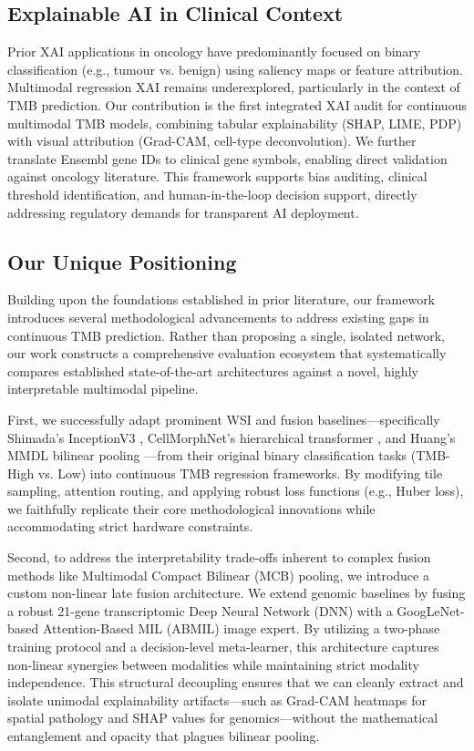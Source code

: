 \documentclass[11pt,a4paper]{article}
\begin{document}
\subsection{Explainable AI in Clinical Context}
Prior XAI applications in oncology have predominantly focused on binary classification (e.g., tumour vs. benign) using saliency maps or feature attribution. Multimodal regression XAI remains underexplored, particularly in the context of TMB prediction. Our contribution is the first integrated XAI audit for continuous multimodal TMB models, combining tabular explainability (SHAP, LIME, PDP) with visual attribution (Grad-CAM, cell-type deconvolution). We further translate Ensembl gene IDs to clinical gene symbols, enabling direct validation against oncology literature. This framework supports bias auditing, clinical threshold identification, and human-in-the-loop decision support, directly addressing regulatory demands for transparent AI deployment.

\subsection{Our Unique Positioning}
Building upon the foundations established in prior literature, our framework introduces several methodological advancements to address existing gaps in continuous TMB prediction. Rather than proposing a single, isolated network, our work constructs a comprehensive evaluation ecosystem that systematically compares established state-of-the-art architectures against a novel, highly interpretable multimodal pipeline.

First, we successfully adapt prominent WSI and fusion baselines—specifically Shimada's InceptionV3 \cite{shimada2021}, CellMorphNet's hierarchical transformer \cite{xu2024cellmorphnet}, and Huang's MMDL bilinear pooling \cite{huang2022}—from their original binary classification tasks (TMB-High vs. Low) into continuous TMB regression frameworks. By modifying tile sampling, attention routing, and applying robust loss functions (e.g., Huber loss), we faithfully replicate their core methodological innovations while accommodating strict hardware constraints.

Second, to address the interpretability trade-offs inherent to complex fusion methods like Multimodal Compact Bilinear (MCB) pooling, we introduce a custom non-linear late fusion architecture. We extend genomic baselines by fusing a robust 21-gene transcriptomic Deep Neural Network (DNN) with a GoogLeNet-based Attention-Based MIL (ABMIL) image expert. By utilizing a two-phase training protocol and a decision-level meta-learner, this architecture captures non-linear synergies between modalities while maintaining strict modality independence. This structural decoupling ensures that we can cleanly extract and isolate unimodal explainability artifacts—such as Grad-CAM heatmaps for spatial pathology and SHAP values for genomics—without the mathematical entanglement and opacity that plagues bilinear pooling.
\end{document}
